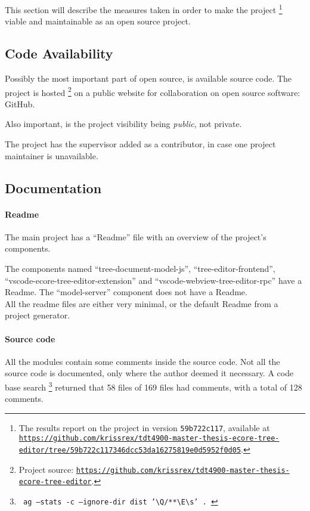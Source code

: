 
This section will describe the measures taken in order to make the project%
\footnote{The results report on the project in version \texttt{59b722c117}, available at \href{https://github.com/krissrex/tdt4900-master-thesis-ecore-tree-editor/tree/59b722c117346dcc53da16275819e0d5952f0d05}{\nolinkurl{https://github.com/krissrex/tdt4900-master-thesis-ecore-tree-editor/tree/59b722c117346dcc53da16275819e0d5952f0d05}}.}
viable and maintainable as an \gls{open source} project.

\subsection{Code Availability}

Possibly the most important part of \gls{open source}, is available source code.
The project is hosted%
\footnote{Project source: \href{https://github.com/krissrex/tdt4900-master-thesis-ecore-tree-editor}{\nolinkurl{https://github.com/krissrex/tdt4900-master-thesis-ecore-tree-editor}}.}
on a public website for collaboration on \gls{open source} software: \gls{GitHub}.

Also important, is the project visibility being \textit{public}, not private.

The project has the supervisor added as a contributor, in case one project maintainer is unavailable.

\subsection{Documentation}

\paragraph{Readme}
The main project has a ``Readme'' file with an overview of the project's components.

The components named ``tree-document-model-js'', ``tree-editor-frontend'', ``vscode-ecore-tree-editor-extension'' and ``vscode-webview-tree-editor-rpc'' have a Readme.
The ``model-server'' component does not have a Readme.\\

All the readme files are either very minimal, or the default Readme from a project generator.


\paragraph{Source code}
All the modules contain some comments inside the source code.
Not all the source code is documented, only where the author deemed it necessary.
A code base search%
\footnote{
\texttt{
ag --stats -c --ignore-dir dist '\textbackslash{}Q/**\textbackslash{}E\textbackslash{}s' .
}}
returned that 58 files of 169 files had comments, with a total of 128 comments.

